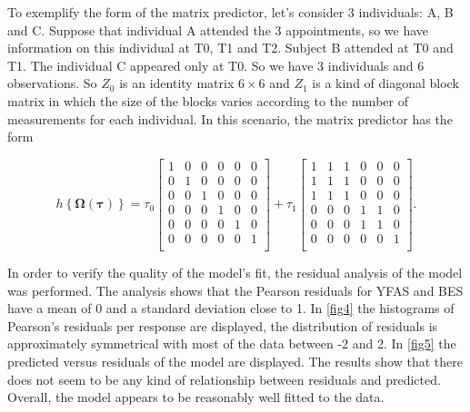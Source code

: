 \documentclass[AMA,STIX1COL]{WileyNJD-v2}
\begin{document}
To exemplify the form of the matrix predictor, let's consider 3 individuals: A, B and C. Suppose that individual A attended the 3 appointments, so we have information on this individual at T0, T1 and T2. Subject B attended at T0 and T1. The individual C appeared only at T0. So we have 3 individuals and 6 observations. So $Z_0$ is an identity matrix $6 \times 6$ and $Z_1$ is a kind of diagonal block matrix in which the size of the blocks varies according to the number of measurements for each individual. In this scenario, the matrix predictor has the form

\begin{equation}
h\left \{ \boldsymbol{\Omega}(\boldsymbol{\tau}) \right \} = 
\tau_0 \begin{bmatrix}
1 & 0 & 0 & 0 & 0 & 0\\ 
0 & 1 & 0 & 0 & 0 & 0\\ 
0 & 0 & 1 & 0 & 0 & 0\\ 
0 & 0 & 0 & 1 & 0 & 0\\ 
0 & 0 & 0 & 0 & 1 & 0\\ 
0 & 0 & 0 & 0 & 0 & 1\\ 
\end{bmatrix} + 
\tau_1 \begin{bmatrix}
1 & 1 & 1 & 0 & 0 & 0\\ 
1 & 1 & 1 & 0 & 0 & 0\\ 
1 & 1 & 1 & 0 & 0 & 0\\ 
0 & 0 & 0 & 1 & 1 & 0\\ 
0 & 0 & 0 & 1 & 1 & 0\\ 
0 & 0 & 0 & 0 & 0 & 1\\ 
\end{bmatrix}.
\end{equation}

In order to verify the quality of the model's fit, the residual analysis of the model was performed. The analysis shows that the Pearson residuals for YFAS and BES have a mean of 0 and a standard deviation close to 1. In \autoref{fig4} the histograms of Pearson's residuals per response are displayed, the distribution of residuals is approximately symmetrical with most of the data between -2 and 2. In \autoref{fig5} the predicted versus residuals of the model are displayed. The results show that there does not seem to be any kind of relationship between residuals and predicted. Overall, the model appears to be reasonably well fitted to the data.
\end{document}
